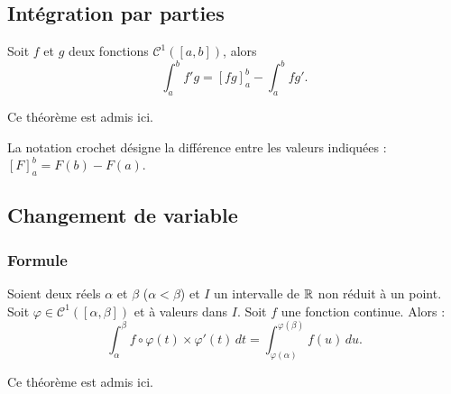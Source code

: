 \subsection{Intégration par parties}
\begin{thm}
 Soit $f$ et $g$ deux fonctions $\mathcal{C}^1([a,b])$, alors
\begin{displaymath}
 \int_a^bf'g = [fg]_a^b - \int_a^bfg' .
\end{displaymath}
\end{thm}
\begin{demo}
Ce théorème est admis ici.
\end{demo}
La notation crochet désigne la différence entre les valeurs indiquées : $[F]_a^b = F(b) - F(a)$.

\subsection{Changement de variable}
\subsubsection{Formule}
\begin{thm}
 Soient deux réels $\alpha$ et $\beta$ ($\alpha < \beta$) et $I$ un intervalle de $\mathbb{R}$ non réduit à un point. Soit $\varphi\in \mathcal C^1([\alpha,\beta])$ et à valeurs dans $I$. Soit $f$ une fonction continue. Alors :
\begin{displaymath}
 \int_\alpha ^{\beta}f\circ \varphi(t) \times \varphi'(t)\,dt = \int_{\varphi(\alpha)}^{\varphi(\beta)}f(u)\,du .
\end{displaymath}
\end{thm}
\begin{demo}
Ce théorème est admis ici.
\end{demo}

